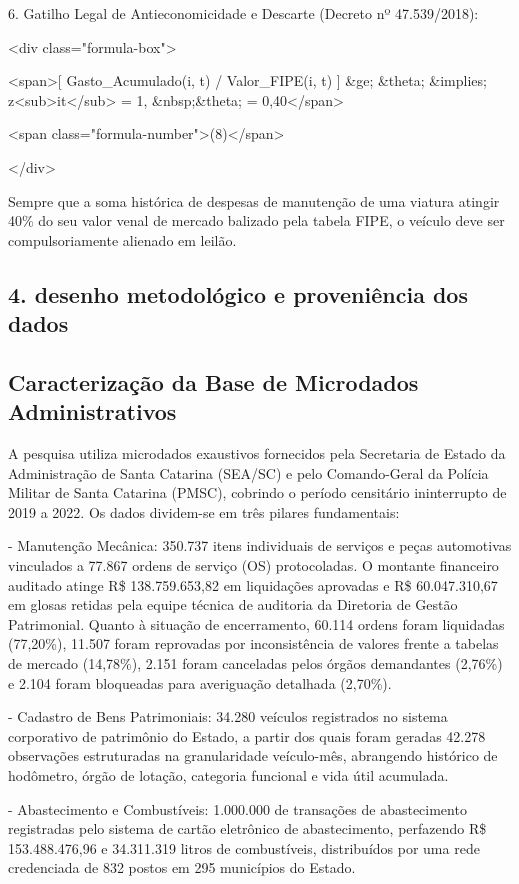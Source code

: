 \documentclass[12pt,a4paper]{article}
\begin{document}
6. Gatilho Legal de Antieconomicidade e Descarte (Decreto nº 47.539/2018):

<div class="formula-box">

<span>[ Gasto\_Acumulado(i, t) / Valor\_FIPE(i, t) ] \&ge; \&theta; \&implies; z<sub>it</sub> = 1, \&nbsp;\&theta; = 0,40</span>

<span class="formula-number">(8)</span>

</div>

Sempre que a soma histórica de despesas de manutenção de uma viatura atingir 40\% do seu valor venal de mercado balizado pela tabela FIPE, o veículo deve ser compulsoriamente alienado em leilão.


\subsection{4. desenho metodológico e proveniência dos dados}


\subsection{Caracterização da Base de Microdados Administrativos}

A pesquisa utiliza microdados exaustivos fornecidos pela Secretaria de Estado da Administração de Santa Catarina (SEA/SC) e pelo Comando-Geral da Polícia Militar de Santa Catarina (PMSC), cobrindo o período censitário ininterrupto de 2019 a 2022. Os dados dividem-se em três pilares fundamentais:

- Manutenção Mecânica: 350.737 itens individuais de serviços e peças automotivas vinculados a 77.867 ordens de serviço (OS) protocoladas. O montante financeiro auditado atinge R\$ 138.759.653,82 em liquidações aprovadas e R\$ 60.047.310,67 em glosas retidas pela equipe técnica de auditoria da Diretoria de Gestão Patrimonial. Quanto à situação de encerramento, 60.114 ordens foram liquidadas (77,20\%), 11.507 foram reprovadas por inconsistência de valores frente a tabelas de mercado (14,78\%), 2.151 foram canceladas pelos órgãos demandantes (2,76\%) e 2.104 foram bloqueadas para averiguação detalhada (2,70\%).

- Cadastro de Bens Patrimoniais: 34.280 veículos registrados no sistema corporativo de patrimônio do Estado, a partir dos quais foram geradas 42.278 observações estruturadas na granularidade veículo-mês, abrangendo histórico de hodômetro, órgão de lotação, categoria funcional e vida útil acumulada.

- Abastecimento e Combustíveis: 1.000.000 de transações de abastecimento registradas pelo sistema de cartão eletrônico de abastecimento, perfazendo R\$ 153.488.476,96 e 34.311.319 litros de combustíveis, distribuídos por uma rede credenciada de 832 postos em 295 municípios do Estado.
\end{document}
